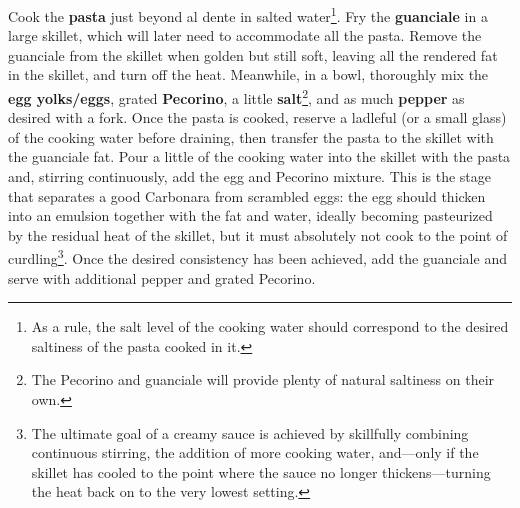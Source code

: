 Cook the \textbf{pasta} just beyond al dente in salted water\footnote{As a rule, the salt level of the cooking water should correspond to the desired saltiness of the pasta cooked in it.}.
Fry the \textbf{guanciale} in a large skillet, which will later need to accommodate all the pasta.
Remove the guanciale from the skillet when golden but still soft, leaving all the rendered fat in the skillet, and turn off the heat.
Meanwhile, in a bowl, thoroughly mix the \textbf{egg yolks/eggs}, grated \textbf{Pecorino}, a little \textbf{salt}\footnote{The Pecorino and guanciale will provide plenty of natural saltiness on their own.}, and as much \textbf{pepper} as desired with a fork.
Once the pasta is cooked, reserve a ladleful (or a small glass) of the cooking water before draining, then transfer the pasta to the skillet with the guanciale fat.
Pour a little of the cooking water into the skillet with the pasta and, stirring continuously, add the egg and Pecorino mixture.
This is the stage that separates a good Carbonara from scrambled eggs: the egg should thicken into an emulsion together with the fat and water, ideally becoming pasteurized by the residual heat of the skillet, but it must absolutely not cook to the point of curdling\footnote{The ultimate goal of a creamy sauce is achieved by skillfully combining continuous stirring, the addition of more cooking water, and---only if the skillet has cooled to the point where the sauce no longer thickens---turning the heat back on to the very lowest setting.}.
Once the desired consistency has been achieved, add the guanciale and serve with additional pepper and grated Pecorino.


\begin{recipeblock}
	
\end{recipeblock}